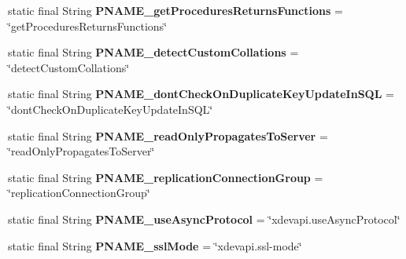 \begin{DoxyCompactItemize}
static final String {\bfseries P\+N\+A\+M\+E\+\_\+get\+Procedures\+Returns\+Functions} = \char`\"{}get\+Procedures\+Returns\+Functions\char`\"{}
\item 
\mbox{\label{classcom_1_1mysql_1_1cj_1_1conf_1_1_property_definitions_a3d19cb79397cc5b9c6ca7269520f132c}} 
static final String {\bfseries P\+N\+A\+M\+E\+\_\+detect\+Custom\+Collations} = \char`\"{}detect\+Custom\+Collations\char`\"{}
\item 
\mbox{\label{classcom_1_1mysql_1_1cj_1_1conf_1_1_property_definitions_a666c09b4c6daf6dd64f031ef0171ba4a}} 
static final String {\bfseries P\+N\+A\+M\+E\+\_\+dont\+Check\+On\+Duplicate\+Key\+Update\+In\+S\+QL} = \char`\"{}dont\+Check\+On\+Duplicate\+Key\+Update\+In\+S\+QL\char`\"{}
\item 
\mbox{\label{classcom_1_1mysql_1_1cj_1_1conf_1_1_property_definitions_a8bc41630c309e11509ac840f4c4d5ad7}} 
static final String {\bfseries P\+N\+A\+M\+E\+\_\+read\+Only\+Propagates\+To\+Server} = \char`\"{}read\+Only\+Propagates\+To\+Server\char`\"{}
\item 
\mbox{\label{classcom_1_1mysql_1_1cj_1_1conf_1_1_property_definitions_ab02b1a6902ac145dc02775537dc19093}} 
static final String {\bfseries P\+N\+A\+M\+E\+\_\+replication\+Connection\+Group} = \char`\"{}replication\+Connection\+Group\char`\"{}
\item 
\mbox{\label{classcom_1_1mysql_1_1cj_1_1conf_1_1_property_definitions_aba68ba0b6d46996e85f18c5ad414c0d7}} 
static final String {\bfseries P\+N\+A\+M\+E\+\_\+use\+Async\+Protocol} = \char`\"{}xdevapi.\+use\+Async\+Protocol\char`\"{}
\item 
\mbox{\label{classcom_1_1mysql_1_1cj_1_1conf_1_1_property_definitions_aed84e1e8232687f1f9cf2c1e629e99c5}} 
static final String {\bfseries P\+N\+A\+M\+E\+\_\+ssl\+Mode} = \char`\"{}xdevapi.\+ssl-\/mode\char`\"{}
\item 
\mbox{\label{classcom_1_1mysql_1_1cj_1_1conf_1_1_property_definitions_ac01368426939594c20d25edfdf2b6f91}} 

\end{DoxyCompactItemize}
